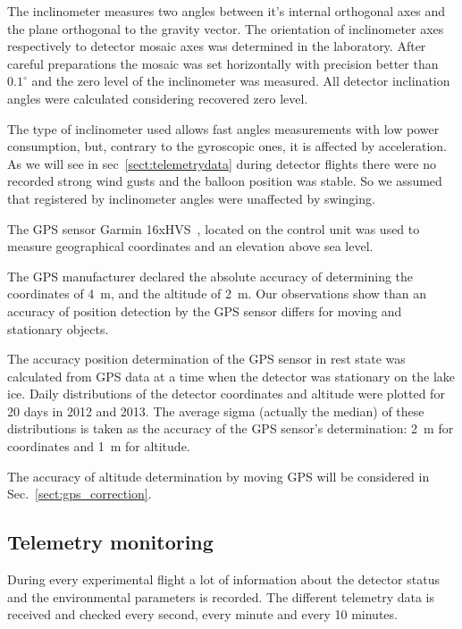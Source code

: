 \documentclass[final,5p,times,twocolumn]{elsarticle}
\begin{document}
The inclinometer measures two angles between it's internal orthogonal axes and the plane orthogonal to the gravity vector. The orientation of inclinometer axes respectively to detector mosaic axes was determined in the laboratory. After careful preparations the mosaic was set horizontally with precision better than $0.1^\circ$ and the zero level of the inclinometer was measured. All detector inclination angles were calculated considering recovered zero level.

The type of inclinometer used allows fast angles measurements with low power consumption, but, contrary to the gyroscopic ones, it is affected by acceleration. As we will see in sec~\ref{sect:telemetrydata} during detector flights there were no recorded strong wind gusts and the balloon position was stable. So we assumed that  registered by inclinometer angles were unaffected by swinging.

The GPS sensor Garmin 16xHVS~\cite{GPS-module-specs}, located on the control unit was used to measure geographical coordinates and an elevation above sea level. 

The GPS manufacturer declared the absolute accuracy of determining the coordinates of 4~m, and the altitude of 2~m. Our observations show than an accuracy of position detection by the GPS sensor differs for moving and stationary objects. 

The accuracy position determination of the GPS sensor in rest state was calculated from GPS data at a time when the detector was stationary on the lake ice. Daily distributions of the detector coordinates and altitude were plotted for 20 days in 2012 and 2013. The average sigma (actually the median) of these distributions is taken as the accuracy of the GPS sensor's determination: 2~m for coordinates and 1~m for altitude. 

The accuracy of altitude determination by moving GPS will be considered in Sec.~\ref{sect:gps_correction}.


\subsection{Telemetry monitoring\label{sect:telemetry}}

During every experimental flight a lot of information about the detector status and the environmental parameters is recorded. The different telemetry data is received and checked every second, every minute and every 10 minutes. 
\end{document}
